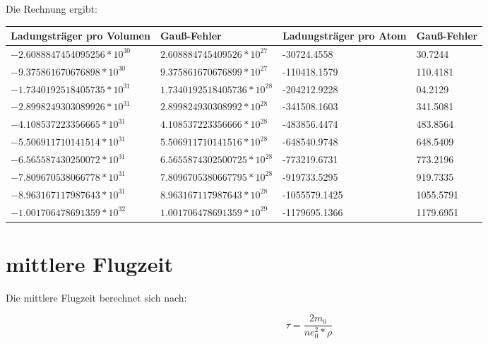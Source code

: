 \documentclass[titlepage=firstcover, captions=tableheading]{scrartcl}
\begin{document}
Die Rechnung ergibt:
\begin{center}
    \begin{tabular}{l @{${}\pm{}$}ll @{${}\pm{}$}l}\\
        \toprule
        Ladungsträger pro Volumen & Gauß-Fehler & Ladungsträger pro Atom & Gauß-Fehler\\
        \midrule
        $-2.6088847454095256*10^{30}$ &  $2.608884745409526 *10^{27} $  &   -30724.4558 &  30.7244\\
        $-9.375861670676898 *10^{30}$  & $9.375861670676899  *10^{27}$    &  -110418.1579 &  110.4181\\
        $-1.7340192518405735*10^{31}$ &  $1.7340192518405736*10^{28} $ &  -204212.9228 &   04.2129   \\   
        $-2.8998249303089926*10^{31}$ &  $2.899824930308992 *10^{28} $  &  -341508.1603 &  341.5081\\
        $-4.108537223356665 *10^{31}$  & $4.108537223356666  *10^{28}$    &  -483856.4474 &   483.8564\\
        $-5.506911710141514 *10^{31}$  & $5.506911710141516  *10^{28}$     &  -648540.9748 &   648.5409\\
        $-6.565587430250072 *10^{31}$  & $6.5655874302500725 *10^{28}$   &  -773219.6731 &   773.2196 \\
        $-7.809670538066778 *10^{31}$  & $7.8096705380667795 *10^{28}$   &  -919733.5295 &    919.7335 \\ 
        $-8.963167117987643 *10^{31}$  & $8.963167117987643  *10^{28}$    &  -1055579.1425 &  1055.5791 \\
        $-1.001706478691359 *10^{32}$  & $1.001706478691359  *10^{29}$   &  -1179695.1366 &  1179.6951 \\
        \bottomrule
    \end{tabular}
\end{center}

\section{mittlere Flugzeit}

Die mittlere Flugzeit berechnet sich nach:

\begin{displaymath}
    \tau = \frac{2m_0}{ne_0^2*\rho}
\end{displaymath}
\end{document}
